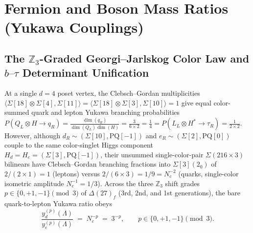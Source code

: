 \documentclass[11pt,a4paper]{article}
\theoremstyle{definition}
\theoremstyle{remark}
\newcommand{\Z}{\mathbb{Z}}
\begin{document}
\section{Fermion and Boson Mass Ratios (Yukawa Couplings)}

\subsection{The $\Z_3$-Graded Georgi--Jarlskog Color Law and $b\text{--}\tau$ Determinant Unification}

At a single $d = 4$ poset vertex, the Clebsch--Gordan multiplicities $\langle \Sigma[18] \otimes \Sigma[4], \Sigma[11]\rangle = \langle \Sigma[18] \otimes \Sigma[3], \Sigma[10]\rangle = 1$ give equal color-summed quark and lepton Yukawa branching probabilities $P(Q_L \otimes H \to q_R) = \frac{\dim(q_R)}{\dim(Q_L)\dim(H)} = \frac{3}{6 \times 2} = \frac{1}{4} = P(L_L \otimes H^* \to \tau_R) = \frac{1}{2 \times 2}$. However, although $d_R \sim (\Sigma[10], \mathrm{PQ}[-1])$ and $e_R \sim (\Sigma[2], \mathrm{PQ}[0])$ couple to the same color-singlet Higgs component $H_d = H_e = (\Sigma[3], \mathrm{PQ}[-1])$, their unsummed single-color-pair $\Sigma(216 \times 3)$ bilinears have Clebsch--Gordan branching fractions into $\Sigma[3](2_0)$ of $2/(2 \times 1) = 1$ (leptons) versus $2 / (6 \times 3) = 1/9 = N_c^{-2}$ (quarks, single-color isometric amplitude $N_c^{-1} = 1/3$). Across the three $\Z_3$ shift grades $p \in \{0, +1, -1\} \pmod 3$ of $\Delta(27)_f$ (3rd, 2nd, and 1st generations), the bare quark-to-lepton Yukawa ratio obeys
\begin{equation}
\label{eq:gj_color_law}
\frac{y_d^{(p)}(\Lambda)}{y_e^{(p)}(\Lambda)} \;=\; N_c^{-p} \;=\; 3^{-p}, \qquad p \in \{0, +1, -1\} \pmod 3.
\end{equation}
\end{document}
